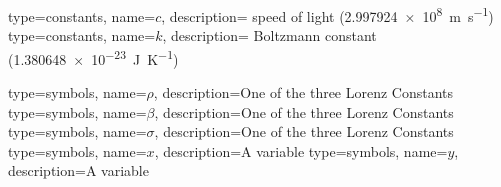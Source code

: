 {
    type=constants,
    name={\ensuremath{c}},
    description={\mbox{} speed of light (\SI{2.997924e8}{\meter\per\second})}
}
{
    type=constants,
    name={\ensuremath{k}},
    description={\mbox{} Boltzmann constant (\SI{1.380648e-23}{\joule\per\kelvin})}
}

{
    type=symbols,
    name={\ensuremath{\rho}},
    description={One of the three Lorenz Constants}
}
{
    type=symbols,
    name={\ensuremath{\beta}},
    description={One of the three Lorenz Constants}
}
{
    type=symbols,
    name={\ensuremath{\sigma}},
    description={One of the three Lorenz Constants}
}
{
    type=symbols,
    name={\ensuremath{x}},
    description={A variable}
}
{
    type=symbols,
    name={\ensuremath{y}},
    description={A variable}
}
